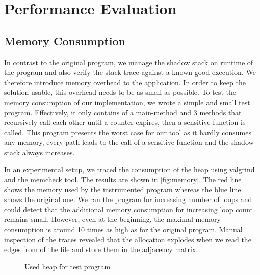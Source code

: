 \documentclass{llncs}
\begin{document}
\section{Performance Evaluation}

\subsection{Memory Consumption}
In contrast to the original program, we manage the shadow stack on runtime of the program and also verify the stack trace against a known good execution. We therefore introduce memory overhead to the application. In order to keep the solution usable, this overhead needs to be as small as possible. To test the memory consumption of our implementation, we wrote a simple and small test program. Effectively, it only contains of a main-method and 3 methods that recursively call each other until a counter expires, then a sensitive function is called. This program presents the worst case for our tool as it hardly consumes any memory, every path leads to the call of a sensitive function and the shadow stack always increases.

In an experimental setup, we traced the consumption of the heap using valgrind and the memcheck tool. The results are shown in \autoref{fig:memory}. The red line shows the memory used by the instrumented program whereas the blue line shows the original one. We ran the program for increasing number of loops and could detect that the additional memory consumption for increasing loop count remains small. However, even at the beginning, the maximal memory consumption is around 10 times as high as for the original program. Manual inspection of the traces revealed that the allocation explodes when we read the edges from of the file and store them in the adjacency matrix.
\datatable

\begin{figure}
  \centering
  \vspace{-0.4cm}
  \caption{Used heap for test program}
  \label{fig:memory}
  \vspace{-0.4cm}
\end{figure}
\end{document}
